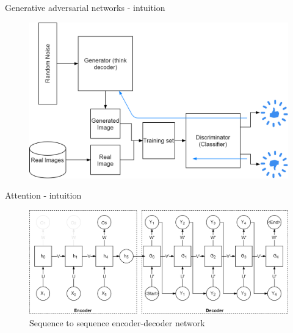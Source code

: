 \begin{frame}{Generative adversarial networks - intuition}
\begin{center}
	\begin{figure}
		\includegraphics[width=1\textwidth]{figures/gan-simple}
	\end{figure}
\end{center}
\end{frame}

\begin{frame}{Attention - intuition} 
\begin{center}
	\begin{figure}
		\includegraphics[width=1\textwidth]{figures/rnn_seq_2_seq_encoder_decoder}
		\caption*{{Sequence to sequence encoder-decoder network}}
	\end{figure}
\end{center}
\end{frame}